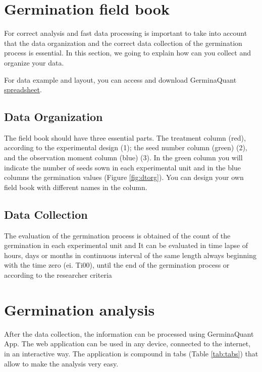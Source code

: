 \documentclass[]{book}
\begin{document}
\chapter{Germination field book}\label{germination-field-book}

For correct analysis and fast data processing is important to take into
account that the data organization and the correct data collection of
the germination process is essential. In this section, we going to
explain how can you collect and organize your data.

For data example and layout, you can access and download GerminaQuant
\href{https://docs.google.com/spreadsheets/d/1QziIXGOwb8cl3GaARJq6Ez6aU7vND_UHKJnFcAKx0VI/edit\#gid=667855537}{spreadsheet}.

\section{Data Organization}\label{data-organization}

The field book should have three essential parts. The treatment column
(red), according to the experimental design (1); the seed number column
(green) (2), and the observation moment column (blue) (3). In the green
column you will indicate the number of seeds sown in each experimental
unit and in the blue columns the germination values (Figure
\ref{fig:dtorg}). You can design your own field book with different
names in the column.

\section{Data Collection}\label{data-collection}

The evaluation of the germination process is obtained of the count of
the germination in each experimental unit and It can be evaluated in
time lapse of hours, days or months in continuous interval of the same
length always beginning with the time zero (ei. Ti00), until the end of
the germination process or according to the researcher criteria

\chapter{Germination analysis}\label{germination-analysis}

After the data collection, the information can be processed using
GerminaQuant App. The web application can be used in any device,
connected to the internet, in an interactive way. The application is
compound in tabs (Table \ref{tab:tabs}) that allow to make the analysis
very easy.
\end{document}
